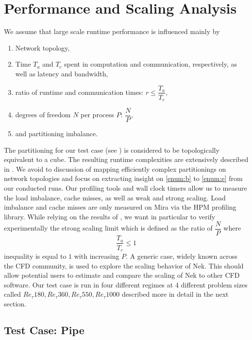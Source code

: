 \documentclass{sig-alternate}
\begin{document}
\section{Performance and Scaling Analysis}
\label{sec:analysis}
We assume that large scale runtime performance is influenced mainly by 
\begin{enumerate}
  \item Network topology, \label{enum:a}
  \item Time $T_a$ and $T_c$ spent in computation and communication,
    respectively, as well as latency and bandwidth\label{enum:b},
  \item ratio of runtime and communication times: $r \leq \dfrac{T_a}{T_c}$,\label{enum:c}
  \item degrees of freedom $N$ per process $P$: $\dfrac{N}{P}$,\label{enum:d}
  \item and partitioning imbalance.\label{enum:e}
\end{enumerate}

The partitioning for our test case (see ) is considered to be
topologically equivalent to a cube. The resulting runtime complexities are
extensively described in \cite{fischer:scaling}. We avoid to discussion of
mapping efficiently complex partitionings on network topologies and focus on
extracting insight on \ref{enum:b} to \ref{enum:e} from our conducted runs. Our
profiling tools and wall clock timers allow us to measure the load imbalance,
cache misses, as well as weak and strong scaling. Load imbalance and cache
misses are only measured on Mira via the HPM profiling library. 
While relying on the results of \cite{tufo:terascale}, we want in particular to verify
experimentally the strong scaling limit which is defined as the ratio of $\dfrac{N}{P}$ where
$$\dfrac{T_a}{T_c}\leq 1$$ inequality is equal to $1$ with increasing $P$. 
A generic case, widely known across the CFD community, is used to explore the
scaling behavior of Nek. This should allow potential users to estimate and
compare the scaling of Nek to other CFD software.
Our test case is run in four different regimes at 4 different problem sizes called
$Re_{\tau} 180, Re_{\tau} 360, Re_{\tau} 550, Re_{\tau} 1000$ described more in
detail in the next section.
\subsection{Test Case: Pipe}
\label{sec:pipe}
\end{document}
